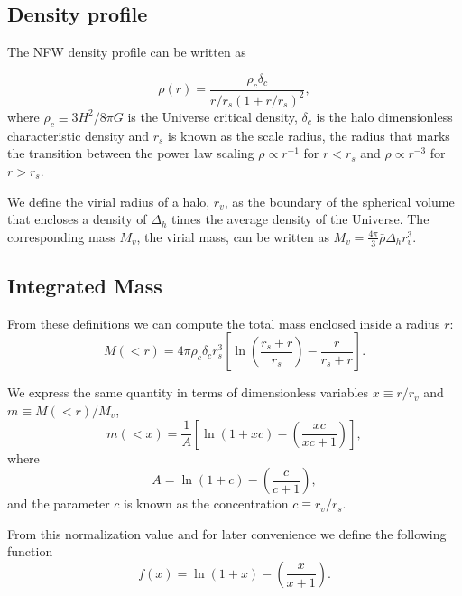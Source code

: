 \documentclass{emulateapj}
\begin{document}
\subsection{Density profile}

The NFW density profile can be written as

\begin{equation}
\rho(r) = \frac{\rho_c\delta_c}{r/r_s(1+r/r_s)^2},
\label{eq:definition}
\end{equation}
%
where $\rho_c\equiv 3H^2/8\pi G$ is the Universe critical density,
$\delta_c$ is the halo dimensionless characteristic density and $r_s$
is known as the scale radius, the radius that marks the transition
between the power law scaling $\rho\propto r^{-1}$ for
$r<r_s$ and $\rho\propto r^{-3}$ for  $r>r_s$.

We define the virial radius of a halo, $r_v$, as the boundary of the
spherical volume that encloses a density of $\Delta_h$ times
the average density of the Universe. The corresponding mass $M_{v}$,
the virial mass, can be written as $M_{v} =
\frac{4\pi}{3}\bar{\rho}\Delta_h r_v^3$.


\subsection{Integrated Mass}
From these definitions we can compute the total mass enclosed inside a
radius $r$:
\begin{equation}
M(<r) = 4\pi\rho_c\delta_c  r_s^3\left[\ln \left
  (\frac{r_s+r}{r_s}\right) - \frac{r}{r_s+r}\right].
\end{equation}

We express the same quantity in terms of dimensionless
variables $x\equiv r/r_v$ and $m\equiv M(<r)/M_v$,
%
\begin{equation}
m(<x) =
\frac{1}{A}\left[\ln\left(1+xc\right)-\left(\frac{xc}{xc+1}\right)\right],
\label{eq:profile}
\end{equation}
%
where
%
\begin{equation}
A=\ln\left(1+c\right)-\left(\frac{c}{c+1}\right),
\end{equation}
%
and the parameter $c$ is known as the concentration $c\equiv r_v/r_s$.

From this normalization value and for later convenience we define the
following function
%
\begin{equation}
f(x) = \ln\left(1+x\right)-\left(\frac{x}{x+1}\right).
\label{eq:f_NFW}
\end{equation}
%
\end{document}
